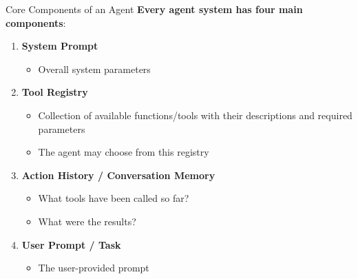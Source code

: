 \documentclass[aspectratio=169]{beamer}
\begin{document}
\begin{frame}{Core Components of an Agent}
\textbf{Every agent system has four main components}:
\vspace{0.3cm}
\begin{enumerate}
    \item \textbf{System Prompt}
    \begin{itemize}
        \item Overall system parameters
    \end{itemize}

    \item \textbf{Tool Registry}
    \begin{itemize}
        \item Collection of available functions/tools with their descriptions and required parameters
        \item The agent may choose from this registry
    \end{itemize}

    \item \textbf{Action History / Conversation Memory}
    \begin{itemize}
        \item What tools have been called so far?
        \item What were the results?
    \end{itemize}

    \item \textbf{User Prompt / Task}
    \begin{itemize}
        \item The user-provided prompt
    \end{itemize}
\end{enumerate}
\end{frame}
\end{document}
